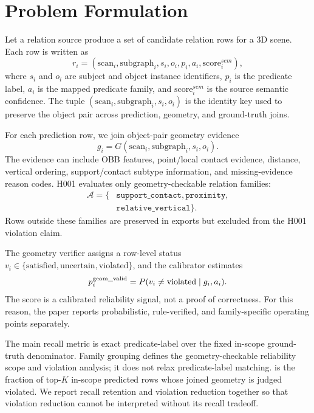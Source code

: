 \section{Problem Formulation}

Let a relation source produce a set of candidate relation rows for a 3D scene.
Each row is written as
\begin{equation}
r_i = (\mathrm{scan}_i,\mathrm{subgraph}_i,s_i,o_i,p_i,a_i,\mathrm{score}^{sem}_i),
\end{equation}
where $s_i$ and $o_i$ are subject and object instance identifiers, $p_i$ is the
predicate label, $a_i$ is the mapped predicate family, and
$\mathrm{score}^{sem}_i$ is the source semantic confidence. The tuple
$(\mathrm{scan}_i,\mathrm{subgraph}_i,s_i,o_i)$ is the identity key used to
preserve the object pair across prediction, geometry, and ground-truth joins.

For each prediction row, we join object-pair geometry evidence
\begin{equation}
g_i = G(\mathrm{scan}_i,\mathrm{subgraph}_i,s_i,o_i).
\end{equation}
The evidence can include OBB features, point/local contact evidence, distance,
vertical ordering, support/contact subtype information, and missing-evidence
reason codes. H001 evaluates only geometry-checkable relation families:
\begin{equation}
\begin{aligned}
\mathcal{A}=\{&\texttt{support\_contact},\texttt{proximity},\\
              &\texttt{relative\_vertical}\}.
\end{aligned}
\end{equation}
Rows outside these families are preserved in exports but excluded from the H001
violation claim.

The geometry verifier assigns a row-level status
$v_i \in \{\mathrm{satisfied},\mathrm{uncertain},\mathrm{violated}\}$, and the
calibrator estimates
\begin{equation}
p^{\mathrm{geom\_valid}}_i = P(v_i \neq \mathrm{violated} \mid g_i,a_i).
\end{equation}
The score is a calibrated reliability signal, not a proof of correctness. For
this reason, the paper reports probabilistic, rule-verified, and
family-specific operating points separately.

The main recall metric is exact predicate-label  over the fixed in-scope
ground-truth denominator. Family grouping defines the geometry-checkable
reliability scope and violation analysis; it does not relax predicate-label
matching.  is the fraction of top-$K$ in-scope predicted rows whose
joined geometry is judged violated. We report recall retention and violation
reduction together so that violation reduction cannot be interpreted without
its recall tradeoff.
